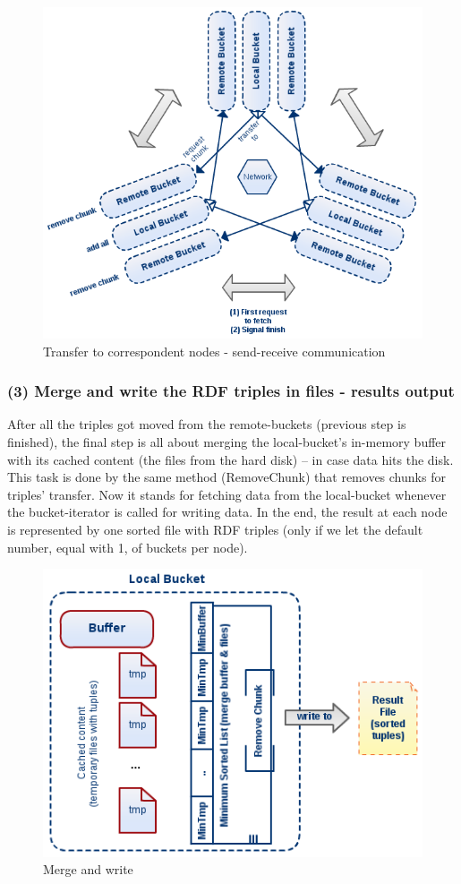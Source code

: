 \begin{figure}
\centering
\includegraphics[scale=0.6]{diag2}
\caption{Transfer to correspondent nodes - send-receive communication}
\end{figure}

% 
\subsubsection*{(3) Merge and write the RDF triples in files - results output}

After all the triples got moved from the remote-buckets (previous step is finished), the final step is all about merging the local-bucket's in-memory buffer with its cached content (the files from the hard disk) -- in case data hits the disk. This task is done by the same method (RemoveChunk) that removes chunks for triples' transfer. Now it stands for fetching data from the local-bucket whenever the bucket-iterator is called for writing data. In the end, the result at each node is represented by one sorted file with RDF triples (only if we let the default number, equal with 1, of buckets per node). 

\begin{figure}
\centering
\includegraphics[scale=0.6]{diag3}
\caption{Merge and write}
\end{figure}


